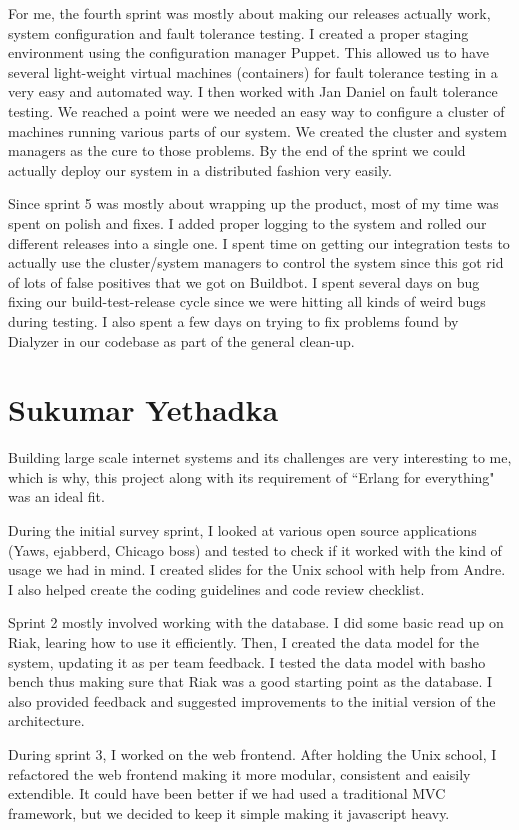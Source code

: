 \documentclass[11pt,a4paper]{report}
\begin{document}
For me, the fourth sprint was mostly about making our releases actually work,
system configuration and fault tolerance testing. I created a proper staging
environment using the configuration manager Puppet. This allowed us to have
several light-weight virtual machines (containers) for fault tolerance testing
in a very easy and automated way. I then worked with Jan Daniel on fault
tolerance testing. We reached a point were we needed an easy way to configure a
cluster of machines running various parts of our system. We created the cluster
and system managers as the cure to those problems. By the end of the sprint we
could actually deploy our system in a distributed fashion very easily.

Since sprint 5 was mostly about wrapping up the product, most of my time was
spent on polish and fixes. I added proper logging to the system and rolled our
different releases into a single one. I spent time on getting our integration
tests to actually use the cluster/system managers to control the system since
this got rid of lots of false positives that we got on Buildbot. I spent several
days on bug fixing our build-test-release cycle since we were hitting all kinds
of weird bugs during testing. I also spent a few days on trying to fix problems
found by Dialyzer in our codebase as part of the general clean-up.
\section{Sukumar Yethadka}
Building large scale internet systems and its challenges are very interesting to me, which is why, this project along with its requirement of ``Erlang for everything" was an ideal fit.

During the initial survey sprint, I looked at various open source applications (Yaws, ejabberd, Chicago boss) and tested to check if it worked with the kind of usage we had in mind. I created slides for the Unix school with help from Andre. I also helped create the coding guidelines and code review checklist.

Sprint 2 mostly involved working with the database. I did some basic read up on Riak, learing how to use it efficiently. Then, I created the data model for the system, updating it as per team feedback. I tested the data model with basho bench thus making sure that Riak was a good starting point as the database. I also provided feedback and suggested improvements to the initial version of the architecture.

During sprint 3, I worked on the web frontend. After holding the Unix school, I refactored the web frontend making it more modular, consistent and eaisily extendible. It could have been better if we had used a traditional MVC framework, but we decided to keep it simple making it javascript heavy.
\end{document}
